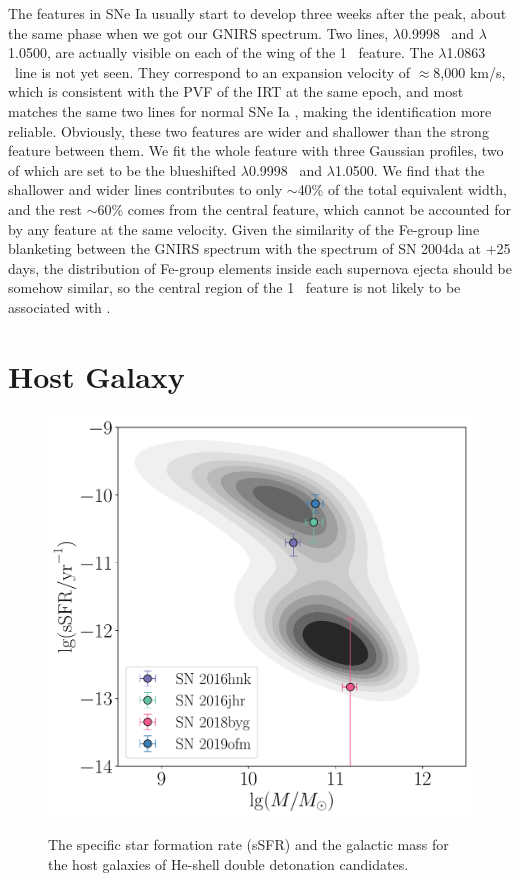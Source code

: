 \documentclass[twocolumn]{aastex631}
\begin{document}
The  features in SNe Ia usually start to develop three weeks after the peak, about the same phase when we got our GNIRS spectrum. Two  lines, $\lambda$0.9998 \micron\ and $\lambda$1.0500, are actually visible on each of the wing of the 1 \micron\ feature. The  $\lambda$1.0863 \micron\ line is not yet seen. They correspond to an expansion velocity of $\approx$8,000 km/s, which is consistent with the PVF of the  IRT at the same epoch, and most matches the same two lines for normal SNe Ia \citep{Marion2009_NIR}, making the identification more reliable. Obviously, these two  features are wider and shallower than the strong feature between them. We fit the whole feature with three Gaussian profiles, two of which are set to be the blueshifted  $\lambda$0.9998 \micron\ and $\lambda$1.0500. We find that the shallower and wider  lines contributes to only $\sim$40\% of the total equivalent width, and the rest $\sim$60\% comes from the central feature, which cannot be accounted for by any  feature at the same velocity. Given the similarity of the Fe-group line blanketing between the GNIRS spectrum with the spectrum of SN 2004da at +25 days, the distribution of Fe-group elements inside each supernova ejecta should be somehow similar, so the central region of the 1 \micron\ feature is not likely to be associated with .

\section{Host Galaxy} \label{sec:host}
\begin{figure}
    \centering
    \includegraphics[width=\linewidth]{host.pdf}
    \label{fig:host}
    \caption{The specific star formation rate (sSFR) and the galactic mass for the host galaxies of He-shell double detonation candidates.}
\end{figure}
\end{document}
